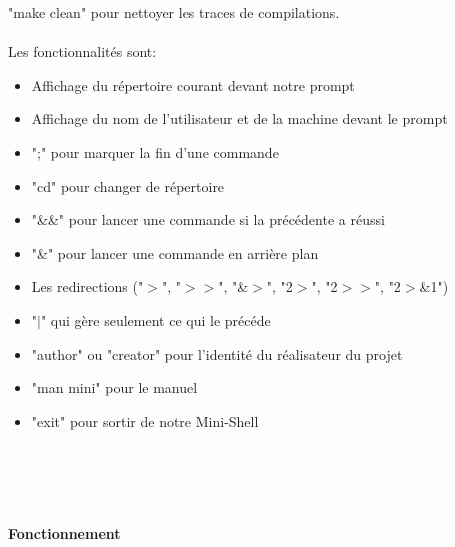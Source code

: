 \documentclass [12pt]{article}
\begin{document}
"make clean" pour nettoyer les traces de compilations.
\\\\Les fonctionnalités sont:
\begin{itemize}
  \item Affichage du répertoire courant devant notre prompt
  \item Affichage du nom de l'utilisateur et de la machine devant le prompt
  \item ";" pour marquer la fin d'une commande
  \item "cd" pour changer de répertoire
  \item "\&\&" pour lancer une commande si la précédente a réussi
  \item "\&" pour lancer une commande en arrière plan
  \item Les redirections ("$>$", "$>$$>$", "\&$>$", "2$>$", "2$>$$>$", "2$>$\&1")
  \item "$|$" qui gère seulement ce qui le précéde
  \item "author" ou "creator" pour l'identité du réalisateur du projet
  \item "man mini" pour le manuel
  \item "exit" pour sortir de notre Mini-Shell
\end{itemize}
\textbf {\\\\\\\\\Large Fonctionnement\\}
\end{document}
